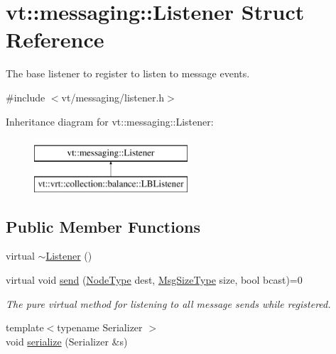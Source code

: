 \hypertarget{structvt_1_1messaging_1_1_listener}{}\section{vt\+:\+:messaging\+:\+:Listener Struct Reference}
\label{structvt_1_1messaging_1_1_listener}


The base listener to register to listen to message events.  




{\ttfamily \#include $<$vt/messaging/listener.\+h$>$}

Inheritance diagram for vt\+:\+:messaging\+:\+:Listener\+:\begin{figure}[H]
\begin{center}
\leavevmode
\includegraphics[height=2.000000cm]{structvt_1_1messaging_1_1_listener}
\end{center}
\end{figure}
\subsection*{Public Member Functions}
\begin{DoxyCompactItemize}
\item 
virtual \hyperlink{structvt_1_1messaging_1_1_listener_aee8a1131c7427cb1f8e2005605f2718c}{$\sim$\+Listener} ()
\item 
virtual void \hyperlink{structvt_1_1messaging_1_1_listener_ab2b334277feecb181a28f613c68bfc53}{send} (\hyperlink{namespacevt_a866da9d0efc19c0a1ce79e9e492f47e2}{Node\+Type} dest, \hyperlink{namespacevt_a408e86a8c7c89309b52907dc5a513924}{Msg\+Size\+Type} size, bool bcast)=0
\begin{DoxyCompactList}\small\item\em The pure virtual method for listening to all message sends while registered. \end{DoxyCompactList}\item 
{\footnotesize template$<$typename Serializer $>$ }\\void \hyperlink{structvt_1_1messaging_1_1_listener_a3ed5e531961a6bd815d237e83d8f0e9c}{serialize} (Serializer \&s)
\end{DoxyCompactItemize}


